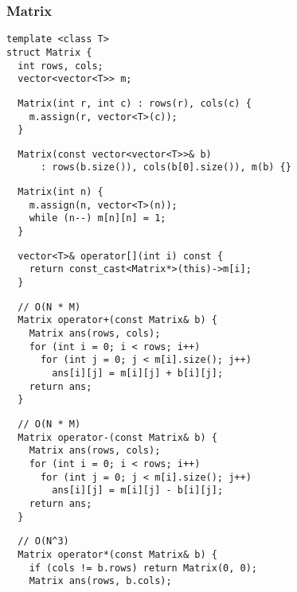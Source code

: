 \documentclass[twoside]{article}
\begin{document}
\begin{multicols*}{2}
\subsubsection*{Matrix}
\begin{verbatim}
template <class T>
struct Matrix {
  int rows, cols;
  vector<vector<T>> m;
\end{verbatim}
\vspace{-12pt}
\begin{verbatim}
  Matrix(int r, int c) : rows(r), cols(c) {
    m.assign(r, vector<T>(c));
  }
\end{verbatim}
\vspace{-12pt}
\begin{verbatim}
  Matrix(const vector<vector<T>>& b)
      : rows(b.size()), cols(b[0].size()), m(b) {}
\end{verbatim}
\vspace{-12pt}
\begin{verbatim}
  Matrix(int n) {
    m.assign(n, vector<T>(n));
    while (n--) m[n][n] = 1;
  }
\end{verbatim}
\vspace{-12pt}
\begin{verbatim}
  vector<T>& operator[](int i) const {
    return const_cast<Matrix*>(this)->m[i];
  }
\end{verbatim}
\vspace{-12pt}
\begin{verbatim}
  // O(N * M)
  Matrix operator+(const Matrix& b) {
    Matrix ans(rows, cols);
    for (int i = 0; i < rows; i++)
      for (int j = 0; j < m[i].size(); j++)
        ans[i][j] = m[i][j] + b[i][j];
    return ans;
  }
\end{verbatim}
\vspace{-12pt}
\begin{verbatim}
  // O(N * M)
  Matrix operator-(const Matrix& b) {
    Matrix ans(rows, cols);
    for (int i = 0; i < rows; i++)
      for (int j = 0; j < m[i].size(); j++)
        ans[i][j] = m[i][j] - b[i][j];
    return ans;
  }
\end{verbatim}
\vspace{-12pt}
\begin{verbatim}
  // O(N^3)
  Matrix operator*(const Matrix& b) {
    if (cols != b.rows) return Matrix(0, 0);
    Matrix ans(rows, b.cols);

\end{verbatim}
\end{multicols*}
\end{document}
